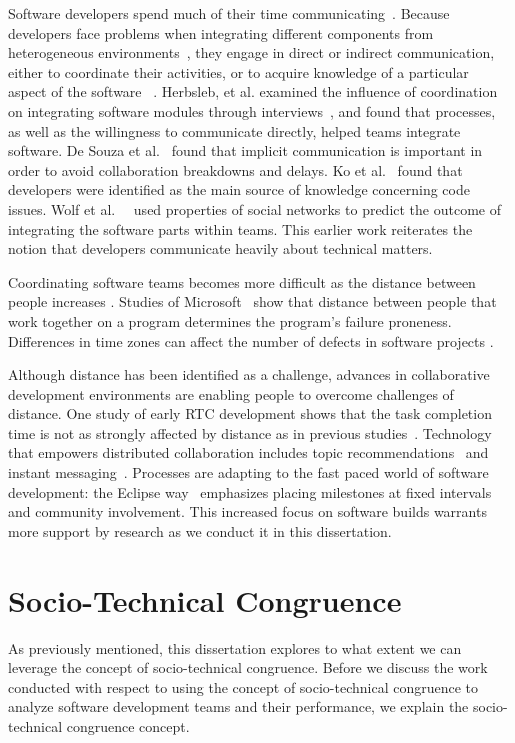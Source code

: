 Software developers spend much of their time
communicating~\cite{perry94}. Because developers face
problems when integrating different components from heterogeneous environments~\cite{redmiles2007:continuous},
they engage in direct or indirect
communication, either to coordinate their activities, or to acquire knowledge of
a particular aspect of the software ~\cite{nakakoji2010:rdc}.
Herbsleb, et al. examined the influence of coordination on integrating software
modules through interviews~\cite{herbsleb1999:architectures}, and found that
processes, as well as the willingness to communicate directly, helped teams
integrate software. De Souza et al.~\cite{desouza2007:awarenessnetwork} found that implicit
communication is important in order to avoid collaboration breakdowns and delays. Ko et al.~\cite{ko:icse:2007} found that developers were identified as the main source of knowledge concerning code issues.
Wolf et al.~~\cite{wolf:icse:2009} used properties of social networks to predict the outcome of integrating the software parts within teams.
This earlier work reiterates the notion that developers communicate heavily about technical matters.

Coordinating software teams becomes more difficult as the distance between people increases \cite{herbsleb:icse:2001}.
Studies of Microsoft~\cite{bird2009:dds_quality,nagappan:icse:2008}
show that distance between people that work together on a
program determines the program's failure proneness.
Differences in time zones can affect the number of defects in software projects \cite{cataldo2009:quality}.

Although distance has been identified as a challenge, advances in collaborative
development environments are enabling people to overcome challenges of distance.
One study of early RTC development
shows that the task completion time is not as strongly affected by distance as in previous studies~\cite{Nguyen:2008Distance}. Technology that empowers distributed collaboration includes topic recommendations~\cite{carter2004} and instant messaging~\cite{niinimaki2008}. Processes are adapting to the fast paced world of software development: the Eclipse way~\cite{frost:ieeesoftware:2007} emphasizes placing milestones at fixed intervals and community involvement.
This increased focus on software builds  warrants more support by research as we conduct it in this dissertation.




\section{Socio-Technical Congruence}
As previously mentioned, this dissertation explores to what extent we can leverage the concept of socio-technical congruence. 
Before we discuss the work conducted with respect to using the concept of socio-technical congruence to analyze software development teams and their performance, we explain the socio-technical congruence concept.

